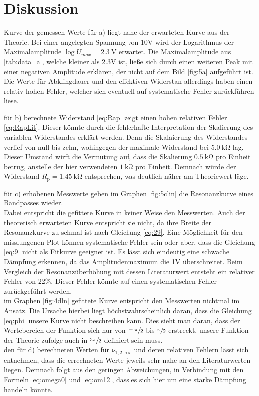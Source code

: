 \section{Diskussion}\justifying

\justifying Kurve der gemessen Werte für a) liegt nahe der erwarteten Kurve aus der Theorie. Bei einer angelegten 
Spannung von 10V wird der Logarithmus der Maximalamplitude $\log{U_{max}} = \SI{2.3}{\volt} $ erwartet. Die Maximalamplitude aus \ref{tab:data_a}, 
welche kleiner als 2.3V ist, ließe sich durch einen weiteren Peak mit einer negativen Amplitude erklären, der nicht auf dem Bild 
\ref{fig:5a} aufgeführt ist. Die Werte für Abklingdauer und den effektiven Widerstan allerdings
haben einen relativ hohen Fehler, welcher sich eventuell auf systematische Fehler
zurückführen liese. 

\justifying für b) berechnete Widerstand \eqref{eq:Rap} zeigt einen hohen relativen Fehler \eqref{eq:RapLit}. 
Dieser könnte durch die fehlerhafte Interpretation der Skalierung des variablen Widerstandes erklärt werden. Denn die Skalaierung 
des Widerstandes verlief von null bis zehn, wohingegen der maximale Widerstand bei $\SI{5.0}{\kilo\ohm} $ lag. Dieser Umstand wirft die 
Vermutung auf, dass die Skalierung $\SI{0.5}{\kilo\ohm}$ pro Einheit betrug, anstelle der hier verwendeten $\SI{1}{\kilo\ohm} $ pro Einheit. Demnach 
würde der Widerstand $R_{\text{p}} = \SI{1.45}{\kilo\ohm}$ entsprechen, was deutlich näher am Theoriewert läge.

\justifying für c) erhobenen Messwerte geben im Graphen \ref{fig:5clin} die Resonanzkurve eines Bandpasses wieder. \\
Dabei entspricht die gefittete Kurve in keiner Weise den Messwerten.
Auch der theoretisch erwarteten Kurve entspricht sie nicht, da ihre Breite der Resonanzkurve zu
schmal ist nach Gleichung \eqref{eq:29}. Eine Möglichkeit für den misslungenen Plot können
systematische Fehler sein oder aber, dass die Gleichung \eqref{eq:9} nicht als Fitkurve
geeignet ist.
Es lässt sich eindeutig eine schwache Dämpfung erkennen, da das Amplitudenmaximum die 1V überschreitet. Beim Vergleich der 
Resonanzüberhöhung mit dessen Literaturwert entsteht ein relativer Fehler von 22$\%$. Dieser Fehler könnte auf einen systematischen 
Fehler zurückgeführt werden. \\

 im Graphen \ref{fig:4dln} gefittete Kurve entspricht den Messwerten nichtmal im Ansatz.
Die Ursache hierbei liegt höchstwahrscheinlich daran, dass die Gleichung \eqref{eq:phi} unsere Kurve nicht
beschreiben kann. Dies sieht man daran, dass der Wertebereich der Funktion sich nur von $\sfrac{-\pi}{2} $ bis
$\sfrac{\pi}{2} $ erstreckt, unsere Funktion der Theorie zufolge auch in $\sfrac{3\pi}{2} $ definiert sein muss.\\
\justifying den für d) berechneten Werten für $\nu_{1,2,\text{res.}}$ und deren relativen Fehlern lässt sich entnehmen,
dass die errechneten Werte jeweils sehr nahe an den Literaturwerten liegen. Demnach folgt aus den geringen Abweichungen, in 
Verbindung mit den Formeln \eqref{eq:omega0} und \eqref{eq:om12}, dass es sich hier um eine starke Dämpfung handeln könnte.

